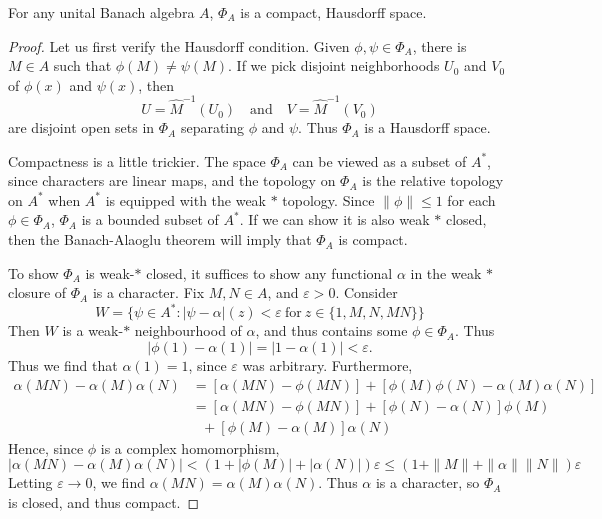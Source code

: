 \begin{theorem}
    For any unital Banach algebra $A$, $\Phi_A$ is a compact, Hausdorff space.
\end{theorem}
\begin{proof}
    Let us first verify the Hausdorff condition. Given $\phi, \psi \in \Phi_A$, there is $M \in A$ such that $\phi(M) \neq \psi(M)$. If we pick disjoint neighborhoods $U_0$ and $V_0$ of $\phi(x)$ and $\psi(x)$, then
    \[ U = \widehat{M}^{-1}(U_0)  \quad\text{and}\quad V = \widehat{M}^{-1}(V_0) \]
    are disjoint open sets in $\Phi_A$ separating $\phi$ and $\psi$. Thus $\Phi_A$ is a Hausdorff space.

    Compactness is a little trickier. The space $\Phi_A$ can be viewed as a subset of $A^*$, since characters are linear maps, and the topology on $\Phi_A$ is the relative topology on $A^*$ when $A^*$ is equipped with the weak $*$ topology. Since $\| \phi \| \leq 1$ for each $\phi \in \Phi_A$, $\Phi_A$ is a bounded subset of $A^*$. If we can show it is also weak $*$ closed, then the Banach-Alaoglu theorem will imply that $\Phi_A$ is compact.

    To show $\Phi_A$ is weak-$*$ closed, it suffices to show any functional $\alpha$ in the weak $*$ closure of $\Phi_A$ is a character. Fix $M,N \in A$, and $\varepsilon > 0$. Consider
    \[ W = \{ \psi \in A^* : | \psi - \alpha | (z) < \varepsilon\ \text{for}\ z \in \{ 1, M, N, MN \} \} \]
    Then $W$ is a weak-$*$ neighbourhood of $\alpha$, and thus contains some $\phi \in \Phi_A$. Thus
    \[ |\phi(1) - \alpha(1)| = | 1 - \alpha(1) | < \varepsilon. \]
    Thus we find that $\alpha(1) = 1$, since $\varepsilon$ was arbitrary. Furthermore,
    \begin{align*}
        \alpha(MN) -   \alpha(M) \alpha(N) &= [\alpha(MN) - \phi(MN)] + [\phi(M)\phi(N) - \alpha(M)\alpha(N)]\\
        &= [\alpha(MN) - \phi(MN)] + [\phi(N) - \alpha(N)] \phi(M)\\
        &\ \ \ + [\phi(M) - \alpha(M)] \alpha(N)
    \end{align*}
    Hence, since $\phi$ is a complex homomorphism,
    \[ | \alpha(MN) - \alpha(M) \alpha(N) | < (1 + |\phi(M)| + |\alpha(N)|) \varepsilon \leq (1 + \| M \| + \| \alpha \| \| N \|) \varepsilon \]
    Letting $\varepsilon \to 0$, we find $\alpha(MN) = \alpha(M) \alpha(N)$. Thus $\alpha$ is a character, so $\Phi_A$ is closed, and thus compact.
\end{proof}


